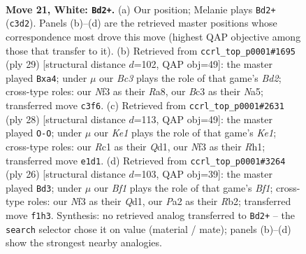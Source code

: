 \documentclass[11pt]{article}
\begin{document}
\clearpage

\begin{figure}[p]\centering
\begin{subfigure}{0.46\textwidth}\centering
\resizebox{\linewidth}{!}{%
\newchessgame
\chessboard[
  setfen={1rb2r2/p1pp1p2/2n1p2k/2q4p/6p1/2B2NP1/PP2PP1P/2R1KB1R w - - 0 21},
  showmover=false,
  pgfstyle=straightmove, color=movearrow, markmove={c3-d2}
]}
\caption{}
\end{subfigure}\hfill
\begin{subfigure}{0.46\textwidth}\centering
\resizebox{\linewidth}{!}{%
\newchessgame
\chessboard[
  setfen={r3kb1r/p2bpppp/1p6/n2R4/Q3P3/5P2/PP1B2PP/4KBNR b Kkq - 0 15},
  showmover=false,
  pgfstyle=straightmove, color=movearrow, markmove={d7-a4}
]}
\caption{}
\end{subfigure}
\\[4pt]
\begin{subfigure}{0.46\textwidth}\centering
\resizebox{\linewidth}{!}{%
\newchessgame
\chessboard[
  setfen={r3r1k1/pp1b1pp1/2n2q1p/3p4/3N4/P1R1PB2/1P3PPP/3QK2R w K - 5 15},
  showmover=false,
  pgfstyle=straightmove, color=movearrow, markmove={e1-g1}
]}
\caption{}
\end{subfigure}\hfill
\begin{subfigure}{0.46\textwidth}\centering
\resizebox{\linewidth}{!}{%
\newchessgame
\chessboard[
  setfen={rnb1k2r/3ppp1p/1p4p1/8/1PP1q3/4PN2/1R3PPP/3QKB1R w Kkq - 0 14},
  showmover=false,
  pgfstyle=straightmove, color=movearrow, markmove={f1-d3}
]}
\caption{}
\end{subfigure}
\caption{\textbf{Move 21, White: \texttt{Bd2+}.} (a) Our position; Melanie plays \texttt{Bd2+} (\texttt{c3d2}). Panels (b)--(d) are the retrieved master positions whose correspondence most drove this move (highest QAP objective among those that transfer to it). (b) Retrieved from \texttt{ccrl\_top\_p0001\#1695} (ply 29) [structural distance $d$=102, QAP obj=49]: the master played \texttt{Bxa4}; under $\mu$ our \emph{Bc3} plays the role of that game's \emph{Bd2}; cross-type roles: our \emph{N}f3 as their \emph{R}a8, our \emph{B}c3 as their \emph{N}a5; transferred move \texttt{c3f6}. (c) Retrieved from \texttt{ccrl\_top\_p0001\#2631} (ply 28) [structural distance $d$=113, QAP obj=49]: the master played \texttt{O-O}; under $\mu$ our \emph{Ke1} plays the role of that game's \emph{Ke1}; cross-type roles: our \emph{R}c1 as their \emph{Q}d1, our \emph{N}f3 as their \emph{R}h1; transferred move \texttt{e1d1}. (d) Retrieved from \texttt{ccrl\_top\_p0001\#3264} (ply 26) [structural distance $d$=103, QAP obj=39]: the master played \texttt{Bd3}; under $\mu$ our \emph{Bf1} plays the role of that game's \emph{Bf1}; cross-type roles: our \emph{N}f3 as their \emph{Q}d1, our \emph{P}a2 as their \emph{R}b2; transferred move \texttt{f1h3}. Synthesis: no retrieved analog transferred to \texttt{Bd2+} -- the \texttt{search} selector chose it on value (material / mate); panels (b)--(d) show the strongest nearby analogies.}
\label{fig:thought-m40}
\end{figure}
\end{document}
